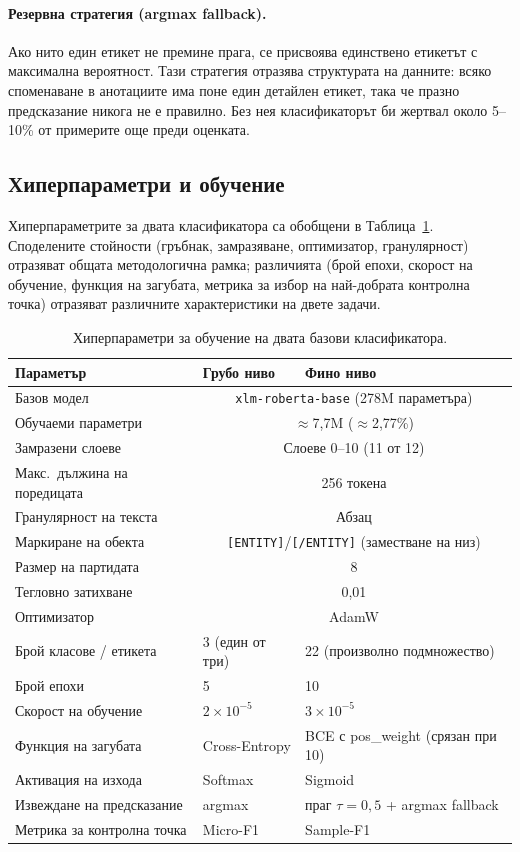 \documentclass[12pt,a4paper]{report}
\begin{document}
\paragraph{Резервна стратегия (argmax fallback).} Ако нито един етикет не премине прага, се присвоява единствено етикетът с максимална вероятност. Тази стратегия отразява структурата на данните: всяко споменаване в анотациите има поне един детайлен етикет, така че празно предсказание никога не е правилно. Без нея класификаторът би жертвал около 5--10\% от примерите още преди оценката.


\subsection{Хиперпараметри и обучение}

Хиперпараметрите за двата класификатора са обобщени в Таблица~\ref{tab:hyperparams}. Споделените стойности (гръбнак, замразяване, оптимизатор, гранулярност) отразяват общата методологична рамка; различията (брой епохи, скорост на обучение, функция на загубата, метрика за избор на най-добрата контролна точка) отразяват различните характеристики на двете задачи.

\begin{table}[H]
\centering
\caption{Хиперпараметри за обучение на двата базови класификатора.}
\label{tab:hyperparams}
\small
\begin{tabular}{lll}
\toprule
\textbf{Параметър} & \textbf{Грубо ниво} & \textbf{Фино ниво} \\
\midrule
Базов модел & \multicolumn{2}{c}{\texttt{xlm-roberta-base} (278M параметъра)} \\
Обучаеми параметри & \multicolumn{2}{c}{$\approx$7,7M ($\approx$2,77\%)} \\
Замразени слоеве & \multicolumn{2}{c}{Слоеве 0--10 (11 от 12)} \\
Макс.\ дължина на поредицата & \multicolumn{2}{c}{256 токена} \\
Гранулярност на текста & \multicolumn{2}{c}{Абзац} \\
Маркиране на обекта & \multicolumn{2}{c}{\texttt{[ENTITY]}/\texttt{[/ENTITY]} (заместване на низ)} \\
Размер на партидата & \multicolumn{2}{c}{8} \\
Тегловно затихване & \multicolumn{2}{c}{0,01} \\
Оптимизатор & \multicolumn{2}{c}{AdamW} \\
\midrule
Брой класове / етикета & 3 (един от три) & 22 (произволно подмножество) \\
Брой епохи & 5 & 10 \\
Скорост на обучение & $2 \times 10^{-5}$ & $3 \times 10^{-5}$ \\
Функция на загубата & Cross-Entropy & BCE с pos\_weight (срязан при 10) \\
Активация на изхода & Softmax & Sigmoid \\
Извеждане на предсказание & argmax & праг $\tau=0{,}5$ + argmax fallback \\
Метрика за контролна точка & Micro-F1 & Sample-F1 \\
\bottomrule
\end{tabular}
\end{table}
\end{document}

